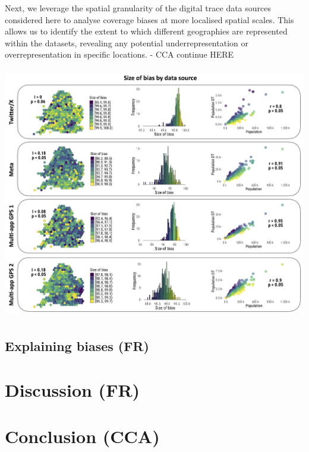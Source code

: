\documentclass[]{rsos}%
\begin{document}
Next, we leverage the spatial granularity of the digital trace data
sources considered here to analyse coverage biases at more localised
spatial scales. This allows us to identify the extent to which different
geographies are represented within the datasets, revealing any potential
underrepresentation or overrepresentation in specific locations. - CCA
continue HERE

\includegraphics[width=5.55208in,height=4.35417in]{figures/Fig-size-bias.png}

\hypertarget{explaining-biases-fr}{%
\subsection{Explaining biases (FR)}\label{explaining-biases-fr}}

\hypertarget{discussion-fr}{%
\section{Discussion (FR)}\label{discussion-fr}}

\hypertarget{conclusion-cca}{%
\section{Conclusion (CCA)}\label{conclusion-cca}}










\end{document}
